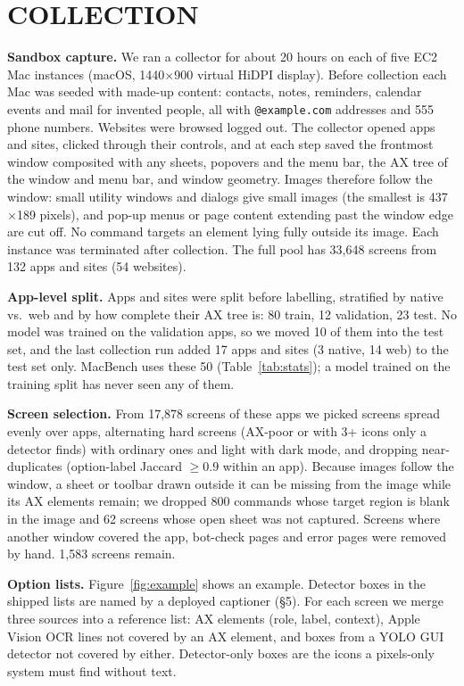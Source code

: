 \documentclass[a4paper,twoside]{article}
\newcommand{\bench}{MacBench}
\begin{document}
\section{\uppercase{Collection}}
\textbf{Sandbox capture.} We ran a collector for about 20 hours on each of five EC2 Mac instances (macOS, 1440$\times$900 virtual HiDPI display). Before collection each Mac was seeded with made-up content: contacts, notes, reminders, calendar events and mail for invented people, all with \texttt{@example.com} addresses and 555 phone numbers. Websites were browsed logged out. The collector opened apps and sites, clicked through their controls, and at each step saved the frontmost window composited with any sheets, popovers and the menu bar, the AX tree of the window and menu bar, and window geometry. Images therefore follow the window: small utility windows and dialogs give small images (the smallest is 437$\times$189 pixels), and pop-up menus or page content extending past the window edge are cut off. No command targets an element lying fully outside its image. Each instance was terminated after collection. The full pool has 33,648 screens from 132 apps and sites (54 websites).

\textbf{App-level split.} Apps and sites were split before labelling, stratified by native vs.\ web and by how complete their AX tree is: 80 train, 12 validation, 23 test. No model was trained on the validation apps, so we moved 10 of them into the test set, and the last collection run added 17 apps and sites (3 native, 14 web) to the test set only. \bench{} uses these 50 (Table~\ref{tab:stats}); a model trained on the training split has never seen any of them.

\textbf{Screen selection.} From 17,878 screens of these apps we picked screens spread evenly over apps, alternating hard screens (AX-poor or with 3+ icons only a detector finds) with ordinary ones and light with dark mode, and dropping near-duplicates (option-label Jaccard $\geq 0.9$ within an app). Because images follow the window, a sheet or toolbar drawn outside it can be missing from the image while its AX elements remain; we dropped 800 commands whose target region is blank in the image and 62 screens whose open sheet was not captured. Screens where another window covered the app, bot-check pages and error pages were removed by hand. 1,583 screens remain.

\textbf{Option lists.} Figure~\ref{fig:example} shows an example. Detector boxes in the shipped lists are named by a deployed captioner (\S5). For each screen we merge three sources into a reference list: AX elements (role, label, context), Apple Vision OCR lines not covered by an AX element, and boxes from a YOLO GUI detector not covered by either. Detector-only boxes are the icons a pixels-only system must find without text.
\end{document}
